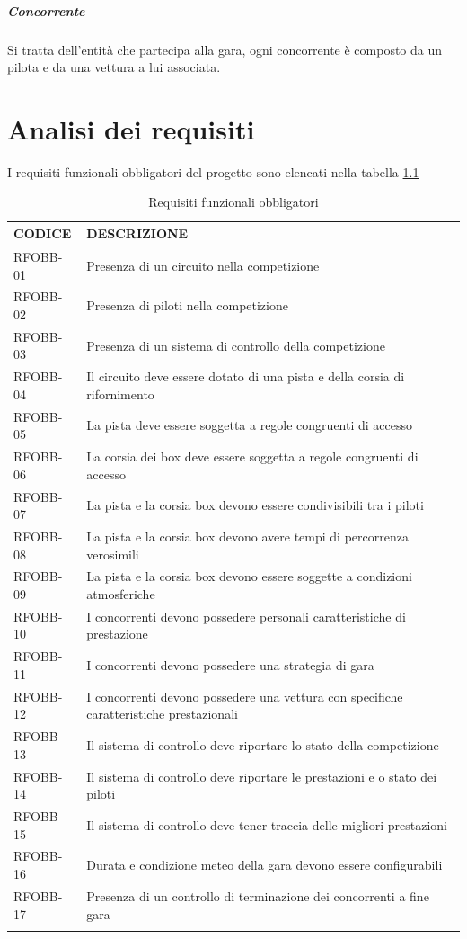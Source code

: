 \documentclass[a4paper,11pt, twoside]{book}
\begin{document}
      \paragraph{Concorrente}
        Si tratta dell'entità che partecipa alla gara, ogni concorrente è composto da un pilota e da una vettura
	a lui associata.
        
  \chapter{Analisi dei requisiti}
    I requisiti funzionali obbligatori del progetto sono elencati nella tabella \ref{tbl:RequisitiFunzionaliObbligatori}
    
    \begin{longtable}{|p{2cm}|p{8cm}|}
      \toprule
	\bfseries{CODICE} & \bfseries{DESCRIZIONE} \\\hline
      \endfirsthead
      RFOBB-01 & Presenza di un circuito nella competizione \\\hline
      RFOBB-02 & Presenza di piloti nella competizione \\\hline 
      RFOBB-03 & Presenza di un sistema di controllo della competizione \\\hline
      RFOBB-04 & Il circuito deve essere dotato di una pista e della corsia di rifornimento \\\hline
      RFOBB-05 & La pista deve essere soggetta a regole congruenti di accesso \\\hline
      RFOBB-06 & La corsia dei box deve essere soggetta a regole congruenti di accesso \\\hline
      RFOBB-07 & La pista e la corsia box devono essere condivisibili tra i piloti \\\hline
      RFOBB-08 & La pista e la corsia box devono avere tempi di percorrenza verosimili \\\hline
      RFOBB-09 & La pista e la corsia box devono essere soggette a condizioni atmosferiche \\\hline
      RFOBB-10 & I concorrenti devono possedere personali caratteristiche di prestazione  \\\hline
      RFOBB-11 & I concorrenti devono possedere una strategia di gara  \\\hline
      RFOBB-12 & I concorrenti devono possedere una vettura con specifiche caratteristiche prestazionali  \\\hline
      RFOBB-13 & Il sistema di controllo deve riportare lo stato della competizione  \\\hline
      RFOBB-14 & Il sistema di controllo deve riportare le prestazioni e o stato dei piloti  \\\hline
      RFOBB-15 & Il sistema di controllo deve tener traccia delle migliori prestazioni  \\\hline
      RFOBB-16 & Durata e condizione meteo della gara devono essere configurabili  \\\hline
      RFOBB-17 & Presenza di un controllo di terminazione dei concorrenti a fine gara  \\\hline
      \caption{Requisiti funzionali obbligatori}
      \label{tbl:RequisitiFunzionaliObbligatori}
    \end{longtable}
\end{document}
